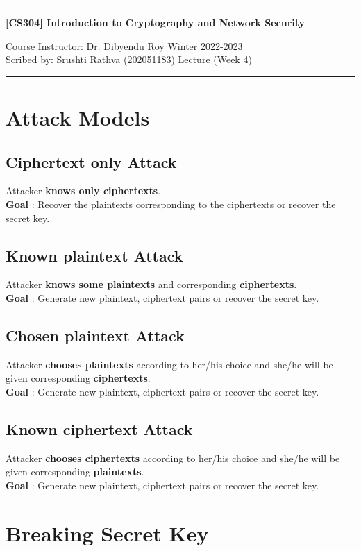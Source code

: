 \documentclass[11pt]{article}
\begin{document}
\noindent
\rule{\textwidth}{1pt}
\begin{center}
{\bf [CS304] Introduction to Cryptography and Network Security}
\end{center}
Course Instructor: Dr. Dibyendu Roy \hfill Winter 2022-2023\\
Scribed by: Srushti Rathva (202051183) \hfill Lecture (Week 4)
\\
\rule{\textwidth}{1pt}

\section*{Attack Models}
\subsection*{Ciphertext only Attack}
Attacker \textbf{knows only ciphertexts}. \\
\textbf{Goal} : Recover the plaintexts corresponding to the ciphertexts or recover the secret key.

\subsection*{Known plaintext Attack}
Attacker \textbf{knows some plaintexts} and corresponding \textbf{ciphertexts}. \\
\textbf{Goal} : Generate new plaintext, ciphertext pairs or recover the secret key.

\subsection*{Chosen plaintext Attack}
Attacker \textbf{chooses plaintexts} according to her/his choice and she/he will be given corresponding \textbf{ciphertexts}. \\
\textbf{Goal} : Generate new plaintext, ciphertext pairs or recover the secret key.

\subsection*{Known ciphertext Attack}
Attacker \textbf{chooses ciphertexts} according to her/his choice and she/he will be given corresponding \textbf{plaintexts}. \\
\textbf{Goal} : Generate new plaintext, ciphertext pairs or recover the secret key.

\section*{Breaking Secret Key}
\end{document}

